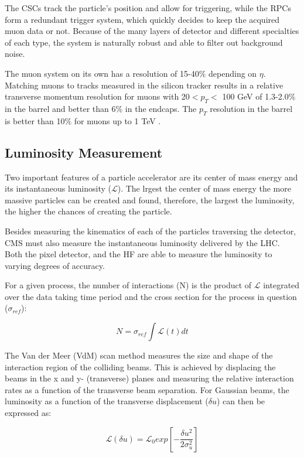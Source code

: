 The CSCs track the particle's position and allow for triggering, while the RPCs form a redundant trigger system, which quickly decides to keep the acquired muon data or not. Because of the many layers of detector and different specialties of each type, the system is naturally robust and able to filter out background noise.

The muon system on its own has a resolution of 15-40$\%$ depending on $\eta$. Matching muons to tracks measured in the silicon tracker results in a relative transverse momentum resolution for muons with 20$< p_{T} < $ 100 GeV of 1.3-2.0$\%$ in the barrel and better than 6$\%$ in the endcaps. The $p_{T}$ resolution in the barrel is better than 10$\%$ for muons up to 1 TeV \cite{Chatrchyan:2012xi}.

\subsection{Luminosity Measurement}

Two important features of a particle accelerator are its center of mass energy and its instantaneous luminosity ($\mathcal{L}$). The lrgest the center of mass energy the more massive particles can be created and found, therefore, the largest the luminosity, the higher the chances of creating the particle.

Besides measuring the kinematics of each of the particles traversing the detector, CMS must also measure the instantaneous luminosity delivered by the LHC. Both the pixel detector, and the HF are able to measure the luminosity to varying degrees of accuracy.

For a given process, the number of interactions (N) is the product of $\mathcal{L}$ integrated over the data taking time period and the cross section for the process in question ($\sigma_{ref}$):

\begin{equation}
N = \sigma_{ref}\int\mathcal{L}(t)dt
\end{equation} 


The Van der Meer (VdM) scan method measures the size and shape of the interaction region of the colliding beams. This is achieved by displacing the beams in the x and y- (transverse) planes and measuring the relative interaction rates as a function of the transverse beam separation. For Gaussian beams, the luminosity as a function of the transverse displacement ($\delta u$) can then be expressed as:  

\begin{equation}
\mathcal{L}(\delta u) = \mathcal{L}_{0} exp[-\frac{\delta u^{2}}{2\sigma_{u}^{2}}]
\end{equation}

